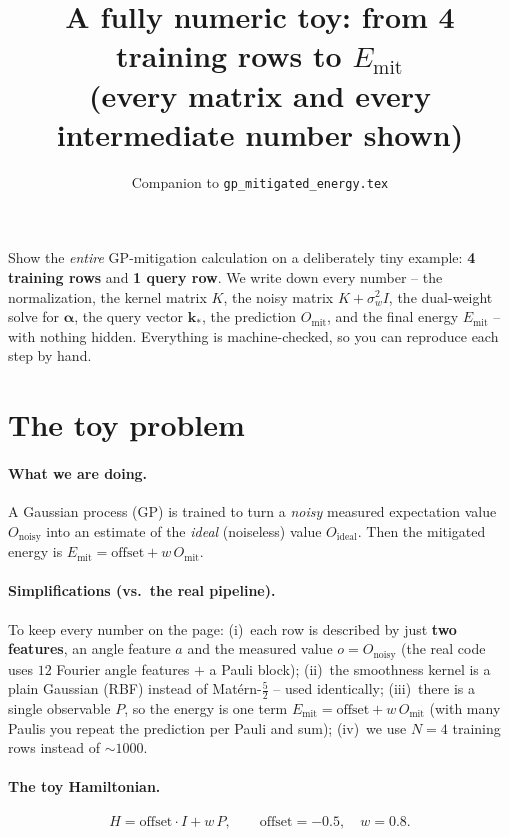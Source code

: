 \documentclass[11pt]{article}
\title{\textbf{A fully numeric toy: from 4 training rows to $E_{\mathrm{mit}}$\\
(every matrix and every intermediate number shown)}}
\author{Companion to \texttt{gp\_mitigated\_energy.tex}}
\date{}
\begin{document}
\maketitle

\begin{tcolorbox}[colback=blue!4!white,colframe=blue!50!black,title=\textbf{Goal of this note}]
Show the \emph{entire} GP-mitigation calculation on a deliberately tiny example:
\textbf{4 training rows} and \textbf{1 query row}. We write down every number --
the normalization, the kernel matrix $K$, the noisy matrix $K+\sigma_w^2 I$, the
dual-weight solve for $\bm\alpha$, the query vector $\bm k_*$, the prediction
$O_{\mathrm{mit}}$, and the final energy $E_{\mathrm{mit}}$ -- with nothing hidden.
Everything is machine-checked, so you can reproduce each step by hand.
\end{tcolorbox}

\section{The toy problem}

\paragraph{What we are doing.} A Gaussian process (GP) is trained to turn a
\emph{noisy} measured expectation value $O_{\mathrm{noisy}}$ into an estimate of
the \emph{ideal} (noiseless) value $O_{\mathrm{ideal}}$. Then the mitigated energy
is $E_{\mathrm{mit}}=\text{offset}+w\,O_{\mathrm{mit}}$.

\paragraph{Simplifications (vs.\ the real pipeline).} To keep every number on the
page: (i)~each row is described by just \textbf{two features}, an angle feature
$a$ and the measured value $o=O_{\mathrm{noisy}}$ (the real code uses $12$ Fourier
angle features $+$ a Pauli block); (ii)~the smoothness kernel is a plain Gaussian
(RBF) instead of Mat\'ern-$\tfrac52$ -- used identically; (iii)~there is a single
observable $P$, so the energy is one term $E_{\mathrm{mit}}=\text{offset}+w\,
O_{\mathrm{mit}}$ (with many Paulis you repeat the prediction per Pauli and sum);
(iv)~we use $N=4$ training rows instead of $\sim\!1000$.

\paragraph{The toy Hamiltonian.}
\begin{equation}
H=\text{offset}\cdot I+w\,P,\qquad \text{offset}=-0.5,\quad w=0.8 .
\end{equation}
\end{document}

